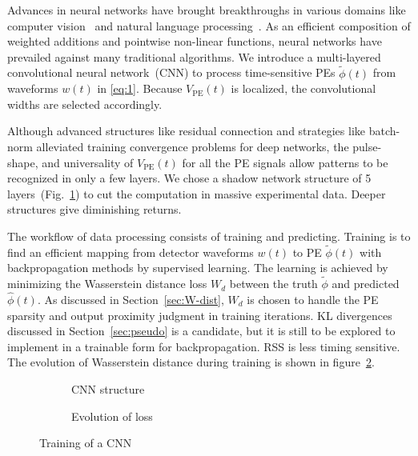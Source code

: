 Advances in neural networks have brought breakthroughs in various domains like computer vision~\cite{he_deep_2015} and natural language processing~\cite{vaswani_attention_2017}. As an efficient composition of weighted additions and pointwise non-linear functions, neural networks have prevailed against many traditional algorithms. We introduce a multi-layered convolutional neural network~(CNN) to process time-sensitive PEs $\tilde{\phi}(t)$ from waveforms $w(t)$ in \eqref{eq:1}.  Because $V_\mathrm{PE}(t)$ is localized, the convolutional widths are selected accordingly.

Although advanced structures like residual connection and strategies like batch-norm alleviated training convergence problems for deep networks, the pulse-shape, and universality of $V_\mathrm{PE}(t)$ for all the PE signals allow patterns to be recognized in only a few layers.  We chose a shadow network structure of 5 layers~(Fig.~\ref{fig:struct}) to cut the computation in massive experimental data.  Deeper structures give diminishing returns.

The workflow of data processing consists of training and predicting. Training is to find an efficient mapping from detector waveforms $w(t)$ to PE $\tilde{\phi}(t)$ with backpropagation methods by supervised learning.  The learning is achieved by minimizing the Wasserstein distance loss $W_d$ between the truth $\tilde{\phi}$ and predicted $\hat{\phi}(t)$.  As discussed in Section~\ref{sec:W-dist}, $W_d$ is chosen to handle the PE sparsity and output proximity judgment in training iterations.  KL divergences discussed in Section~\ref{sec:pseudo} is a candidate, but it is still to be explored to implement in a trainable form for backpropagation.  RSS is less timing sensitive.  The evolution of Wasserstein distance during training is shown in figure~\ref{fig:loss}.

\begin{figure}[H]
  \begin{subfigure}{0.35\textwidth}
    \centering
    \begin{adjustbox}{width=0.65\textwidth}
      
    \end{adjustbox}
    \caption{\label{fig:struct} CNN structure}
  \end{subfigure}
  \begin{subfigure}{0.6\textwidth}
    \centering
    \resizebox{\textwidth}{!}{}
    \caption{\label{fig:loss} Evolution of loss}
  \end{subfigure}
  \caption{\label{fig:CNN} Training of a CNN}
\end{figure}

